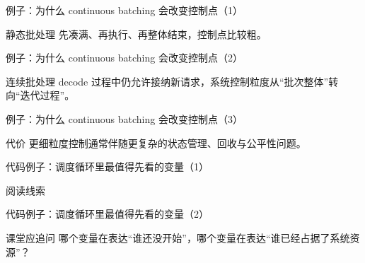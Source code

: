 \begin{frame}{例子：为什么 continuous batching 会改变控制点（1）}
\begin{block}{静态批处理}
    先凑满、再执行、再整体结束，控制点比较粗。
  \end{block}
\end{frame}

\begin{frame}{例子：为什么 continuous batching 会改变控制点（2）}
\begin{block}{连续批处理}
    decode 过程中仍允许接纳新请求，系统控制粒度从“批次整体”转向“迭代过程”。
  \end{block}
\end{frame}

\begin{frame}{例子：为什么 continuous batching 会改变控制点（3）}
\begin{block}{代价}
    更细粒度控制通常伴随更复杂的状态管理、回收与公平性问题。
  \end{block}
\end{frame}

\begin{frame}{代码例子：调度循环里最值得先看的变量（1）}
\begin{block}{阅读线索}
    {\ttfamily\small
    \par
    \par
    \par
    \par
    }
  \end{block}
\end{frame}

\begin{frame}{代码例子：调度循环里最值得先看的变量（2）}
\begin{block}{课堂应追问}
    哪个变量在表达“谁还没开始”，哪个变量在表达“谁已经占据了系统资源”？
  \end{block}
\end{frame}

